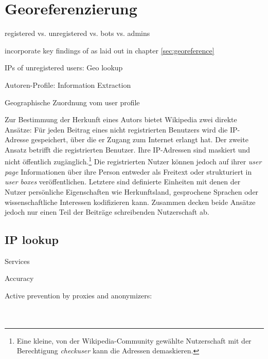 \section{Georeferenzierung}

\begin{todos}
    \item registered vs. unregistered vs. bots vs. admins
    \item incorporate key findings of \cite{hardy2011volunteered} as laid out in chapter \ref{sec:georeference}
    \item IPs of unregistered users: Geo lookup
    \item Autoren-Profile: Information Extraction
    \item Geographische Zuordnung vom user profile
\end{todos}

Zur Bestimmung der Herkunft eines Autors bietet Wikipedia zwei direkte Ansätze: 
Für jeden Beitrag eines nicht registrierten Benutzers wird die IP-Adresse gespeichert, über die er Zugang zum Internet erlangt hat. 
Der zweite Ansatz betrifft die registrierten Benutzer.
Ihre IP-Adressen sind maskiert und nicht öffentlich zugänglich.\footnote{Eine kleine, von der Wikipedia-Community gewählte Nutzerschaft mit der Berechtigung \emph{checkuser} kann die Adressen demaskieren.}
Die registrierten Nutzer können jedoch auf ihrer \emph{user page} Informationen über ihre Person entweder als Freitext oder strukturiert in \emph{user boxes} veröffentlichen.
Letztere sind definierte Einheiten mit denen der Nutzer persönliche Eigenschaften wie Herkunftsland, gesprochene Sprachen oder wissenschaftliche Interessen kodifizieren kann.
Zusammen decken beide Ansätze jedoch nur einen Teil der Beiträge schreibenden Nutzerschaft ab.


\subsection{IP lookup}

\begin{todos}
    \item Services
    \item Accuracy
    \item Active prevention by proxies and anonymizers: 
    \\  
    \\ 
    \\ 
\end{todos}

